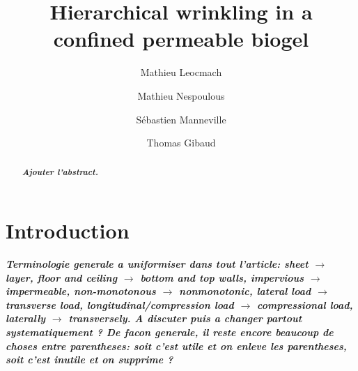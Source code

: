 \documentclass[twocolumn,superscriptaddress,showpacs,preprintnumbers,
amsmath,amssymb,prl]{revtex4-1}
\newcommand{\seb}[1]{\textbf{\color{blue}#1}} %
\begin{document}
\title{Hierarchical wrinkling in a confined permeable biogel}
\author{Mathieu Leocmach}
\author{Mathieu Nespoulous}
\author{Sébastien Manneville}
\author{Thomas Gibaud}

\begin{abstract}
\seb{\it Ajouter l'abstract.}
\end{abstract}

\maketitle

\section*{Introduction}

\seb{\it Terminologie generale a uniformiser dans tout l'article: sheet $\rightarrow$ layer, floor and ceiling $\rightarrow$ bottom and top walls, impervious $\rightarrow$ impermeable, non-monotonous $\rightarrow$ nonmonotonic, lateral load $\rightarrow$ transverse load, longitudinal/compression load $\rightarrow$ compressional load, laterally $\rightarrow$ transversely. A discuter puis a changer partout systematiquement ? De facon generale, il reste encore beaucoup de choses entre parentheses: soit c'est utile et on enleve les parentheses, soit c'est inutile et on supprime ?}
\end{document}
